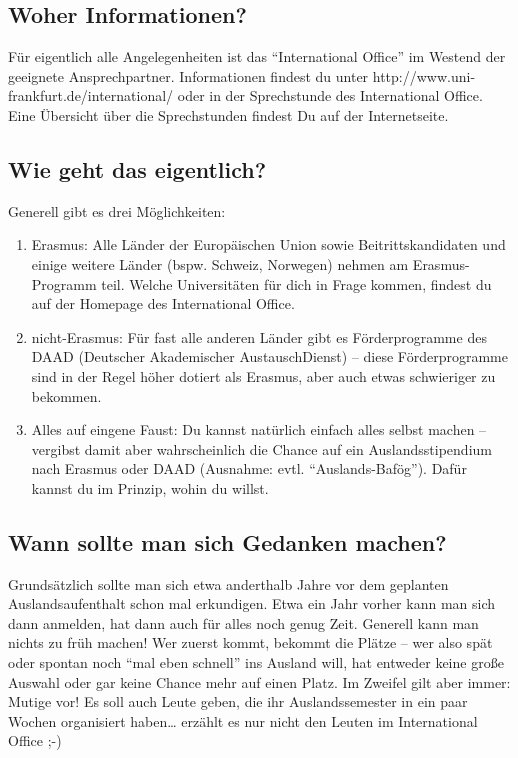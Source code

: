 \subsection{Woher Informationen?}
Für eigentlich alle Angelegenheiten ist das "`International Office"' im Westend der geeignete Ansprechpartner.
Informationen findest du unter http://www.uni-frankfurt.de/international/ oder in der Sprechstunde des International Office. Eine Übersicht über die Sprechstunden findest Du auf der Internetseite.
%
\subsection{Wie geht das eigentlich?}
Generell gibt es drei Möglichkeiten:
\begin{enumerate}
\item Erasmus: Alle Länder der Europäischen Union sowie Beitrittskandidaten und einige weitere Länder (bspw. Schweiz, Norwegen) nehmen am Erasmus-Programm teil. Welche Universitäten für dich in Frage kommen, findest du auf der Homepage des International Office.
\item nicht-Erasmus: Für fast alle anderen Länder gibt es Förderprogramme des DAAD (Deutscher Akademischer AustauschDienst) -- diese Förderprogramme sind in der Regel höher dotiert als Erasmus, aber auch etwas schwieriger zu bekommen.
\item Alles auf eingene Faust: Du kannst natürlich einfach alles selbst machen -- vergibst damit aber wahrscheinlich die Chance auf ein Auslandsstipendium nach Erasmus oder DAAD (Ausnahme: evtl. "`Auslands-Bafög"'). Dafür kannst du im Prinzip, wohin du willst.
\end{enumerate}
%
\subsection{Wann sollte man sich Gedanken machen?}
Grundsätzlich sollte man sich etwa anderthalb Jahre vor dem geplanten Auslandsaufenthalt schon mal erkundigen.
Etwa ein Jahr vorher kann man sich dann anmelden, hat dann auch für alles noch genug Zeit.
Generell kann man nichts zu früh machen!
Wer zuerst kommt, bekommt die Plätze -- wer also spät oder spontan noch "`mal eben schnell"' ins Ausland will,
hat entweder keine große Auswahl oder gar keine Chance mehr auf einen Platz.
Im Zweifel gilt aber immer: Mutige vor!
Es soll auch Leute geben, die ihr Auslandssemester in ein paar Wochen organisiert haben\ldots
erzählt es nur nicht den Leuten im International Office ;-)
%
